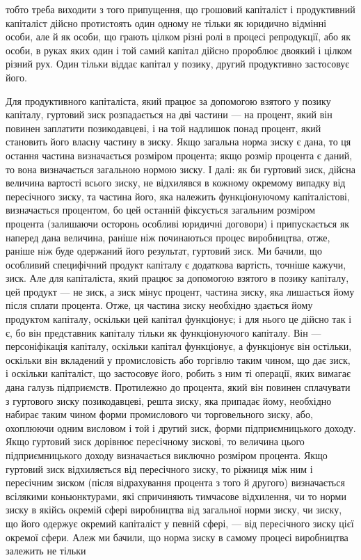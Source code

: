 \parcont{}  %
тобто треба виходити з того припущення, що грошовий капіталіст
і продуктивний капіталіст дійсно протистоять один одному
не тільки як юридично відмінні особи, але й як особи, що грають
цілком різні ролі в процесі репродукції, або як особи, в руках
яких один і той самий капітал дійсно пророблює двоякий і цілком
різний рух. Один тільки віддає капітал у позику, другий
продуктивно застосовує його.

Для продуктивного капіталіста, який працює за допомогою взятого
у позику капіталу, гуртовий зиск розпадається на дві частини
— на процент, який він повинен заплатити позикодавцеві, і на
той надлишок понад процент, який становить його власну частину
в зиску. Якщо загальна норма зиску є дана, то ця остання частина
визначається розміром процента; якщо розмір процента є даний,
то вона визначається загальною нормою зиску. І далі: як би гуртовий
зиск, дійсна величина вартості всього зиску, не відхилявся
в кожному окремому випадку від пересічного зиску, та частина
його, яка належить функціонуючому капіталістові, визначається
процентом, бо цей останній фіксується загальним розміром процента
(залишаючи осторонь особливі юридичні договори) і припускається
як наперед дана величина, раніше ніж починаються
процес виробництва, отже, раніше ніж буде одержаний його результат,
гуртовий зиск. Ми бачили, що особливий специфічний продукт
капіталу є додаткова вартість, точніше кажучи, зиск. Але для
капіталіста, який працює за допомогою взятого в позику капіталу,
цей продукт — не зиск, а зиск мінус процент, частина зиску, яка
лишається йому після сплати процента. Отже, ця частина зиску
необхідно здається йому продуктом капіталу, оскільки цей капітал
функціонує; і для нього це дійсно так і є, бо він представник
капіталу тільки як функціонуючого капіталу. Він — персоніфікація
капіталу, оскільки капітал функціонує, а функціонує він
остільки, оскільки він вкладений у промисловість або торгівлю
таким чином, що дає зиск, і оскільки капіталіст, що застосовує
його, робить з ним ті операції, яких вимагає дана галузь підприємств.
Протилежно до процента, який він повинен сплачувати
з гуртового зиску позикодавцеві, решта зиску, яка
припадає йому, необхідно набирає таким чином форми промислового
чи торговельного зиску, або, охоплюючи одним висловом
і той і другий зиск, форми підприємницького доходу. Якщо
гуртовий зиск дорівнює пересічному зискові, то величина цього
підприємницького доходу визначається виключно розміром процента.
Якщо гуртовий зиск відхиляється від пересічного зиску,
то ріжниця між ним і пересічним зиском (після відрахування
процента з того й другого) визначається всілякими коньюнктурами,
які спричиняють тимчасове відхилення, чи то норми зиску
в якійсь окремій сфері виробництва від загальної норми зиску,
чи зиску, що його одержує окремий капіталіст у певній сфері, —
від пересічного зиску цієї окремої сфери. Алеж ми бачили, що
норма зиску в самому процесі виробництва залежить не тільки
\parbreak{}  %
